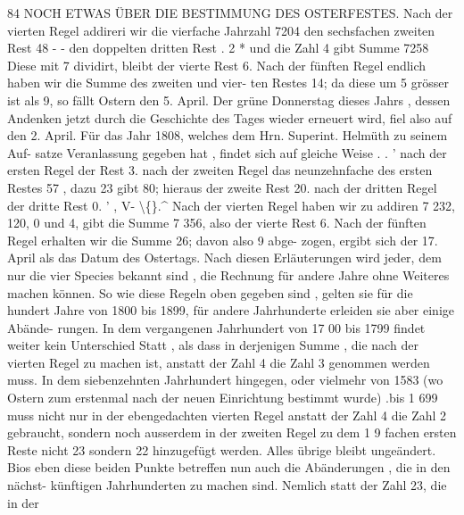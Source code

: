 \documentclass[12pt,a4paper]{article}
\begin{document}
\newpage

84  NOCH  ETWAS  ÜBER  DIE  BESTIMMUNG  DES  OSTERFESTES.
Nach  der  vierten  Regel  addireri  wir  die  vierfache  Jahrzahl         7204
den  sechsfachen  zweiten  Rest         48
-        -  den  doppelten  dritten  Rest       .  2
*  und  die  Zahl    4
  gibt  Summe     7258
Diese  mit  7   dividirt,  bleibt  der  vierte  Rest  6.
Nach  der  fünften  Regel  endlich  haben  wir  die  Summe  des  zweiten  und  vier-
ten Restes   14;  da  diese  um  5  grösser  ist  als  9,  so  fällt  Ostern  den  5.  April.
Der  grüne  Donnerstag  dieses  Jahrs ,  dessen  Andenken  jetzt  durch  die  Geschichte
des  Tages  wieder  erneuert  wird,  fiel  also  auf  den  2.  April.
Für  das  Jahr  1808,  welches  dem  Hrn.  Superint.  Helmüth  zu  seinem  Auf-
satze Veranlassung  gegeben  hat ,  findet  sich  auf  gleiche  Weise
.  .    '   nach  der  ersten  Regel  der  Rest  3.
nach  der  zweiten  Regel  das  neunzehnfache  des  ersten  Restes  57 ,   dazu
23  gibt  80;  hieraus  der  zweite  Rest  20.
nach  der  dritten  Regel  der  dritte  Rest  0.  '     ,   V-    \textbackslash\{\}.\^{}
Nach  der  vierten  Regel  haben  wir  zu  addiren  7  232,  120,  0  und  4,  gibt
die  Summe  7  356,  also  der  vierte  Rest  6.
Nach  der  fünften  Regel  erhalten  wir  die  Summe  26;  davon  also  9  abge-
zogen, ergibt  sich  der  17.  April  als  das  Datum  des  Ostertags.
Nach  diesen  Erläuterungen  wird  jeder,  dem  nur  die  vier  Species  bekannt
sind ,  die  Rechnung  für  andere  Jahre  ohne  Weiteres  machen  können.
So  wie  diese  Regeln  oben  gegeben  sind ,  gelten  sie  für  die  hundert  Jahre
von  1800  bis  1899,  für  andere  Jahrhunderte  erleiden  sie  aber  einige  Abände-
rungen. In  dem  vergangenen  Jahrhundert  von  17  00  bis  1799  findet  weiter  kein
Unterschied  Statt ,  als  dass  in  derjenigen  Summe ,  die  nach  der  vierten  Regel  zu
machen  ist,  anstatt  der  Zahl  4  die  Zahl  3  genommen  werden  muss.  In  dem
siebenzehnten  Jahrhundert  hingegen,  oder  vielmehr  von  1583  (wo  Ostern  zum
erstenmal  nach  der  neuen  Einrichtung  bestimmt  wurde) .bis  1  699  muss  nicht  nur
in  der  ebengedachten  vierten  Regel  anstatt  der  Zahl  4  die  Zahl  2  gebraucht,
sondern  noch  ausserdem  in  der  zweiten  Regel  zu  dem  1 9 fachen  ersten  Reste  nicht
23  sondern  22  hinzugefügt  werden.  Alles  übrige  bleibt  ungeändert.  Bios  eben
diese  beiden  Punkte  betreffen  nun  auch  die  Abänderungen ,  die  in  den  nächst-
künftigen Jahrhunderten  zu  machen  sind.     Nemlich  statt  der  Zahl  23,  die  in  der
\end{document}
